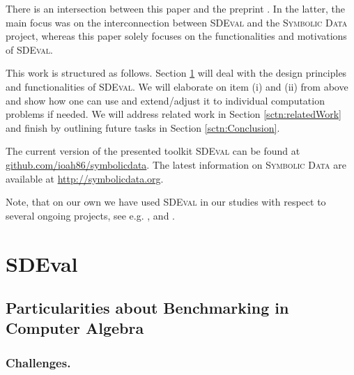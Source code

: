 \documentclass[oribibl,11pt]{article}
\begin{document}
There is an intersection between this paper
and the preprint \cite{heinle2013symbolicdata}. In the
latter, the main focus was on the interconnection between
\textsc{SDEval} and the
\textsc{Symbolic Data} project, whereas this paper solely focuses on
the functionalities and motivations of \textsc{SDEval}.

This work is structured as follows. Section
\ref{sctn:SDEval} will deal with the design principles and
functionalities of \textsc{SDEval}. We will elaborate on item (i) and
(ii) from above and show how one can
use and extend/adjust it to individual computation problems if
needed. We will address related work in Section
\ref{sctn:relatedWork} and finish by outlining future tasks in Section
\ref{sctn:Conclusion}.

The current version of the presented toolkit \textsc{SDEval} can be
found at \url{github.com/ioah86/symbolicdata}.  The latest
information on \textsc{Symbolic Data} are available at
\url{http://symbolicdata.org}.

Note, that on our own we have used \textsc{SDEval} in our studies with
respect to several ongoing projects, see e.g. \cite{CCHLMSU11}, \cite{heinle2013factorization} and \cite{giesbrecht2014factoring}.

\section{SDEval}
\label{sctn:SDEval}

\subsection{Particularities about Benchmarking in Computer Algebra}

\subsubsection{Challenges.}
\end{document}

